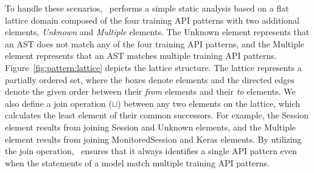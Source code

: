 To handle these scenarios, \tapi~performs a simple static analysis based on  a
flat lattice domain composed of the four training API patterns with two
additional elements, {\it Unknown} and {\it Multiple} elements. 
The Unknown element represents that an AST does not match any of the four
training API patterns, and the Multiple element represents that an AST matches
multiple training API patterns.
Figure~\ref{fig:pattern:lattice} depicts the lattice structure.  
The lattice represents a partially ordered set, where the boxes denote elements
and the directed edges denote the given order between their {\it from} elements
and their {\it to} elements.
We also define a join operation ($\sqcup$) between any two elements on the
lattice, which calculates the least element of their common successors.
For example, the Session element results from joining Session and Unknown
elements, and the Multiple element results from joining MonitoredSession and
Keras elements.
By utilizing the join operation, \tapi~ensures that it always identifies a
single API pattern even when the statements of a model match multiple training
API patterns.


